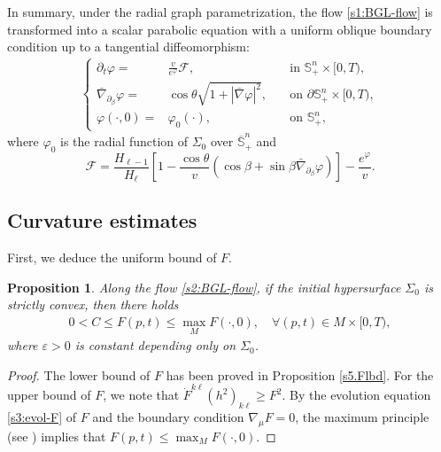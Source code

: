 \documentclass[11pt,reqno]{amsart}
\newtheorem{prop}[thm]{Proposition}
\theoremstyle{definition}
\theoremstyle{remark}
\numberwithin{equation}{section}
\renewcommand{\(}{\left(}
\renewcommand{\)}{\right)}
\renewcommand{\-}{\overline}
\renewcommand{\b}{\beta}
\renewcommand{\t}{\theta}
\begin{document}
In summary, under the radial graph parametrization, the flow \eqref{s1:BGL-flow} is transformed into a scalar parabolic equation with a uniform oblique boundary condition up to a tangential diffeomorphism:
\begin{align}\label{s4:scalar-pde}
\left\{\begin{aligned}
\partial_t\varphi=&\frac{v}{e^\varphi}\mathcal{F}, \quad &\text{in $\mathbb S_+^n \times [0,T)$,}\\
\bar{\nabla}_{\partial_\b}\varphi=&\cos\t \sqrt{1+|\bar{\nabla}\varphi|^2}, \quad &\text{on $\partial \mathbb S_{+}^n\times [0,T)$},\\
\varphi(\cdot,0)=&\varphi_0(\cdot), \quad &\text{on $\mathbb S^n_{+}$},
\end{aligned}\right.
\end{align}
where $\varphi_0$ is the radial function of $\Sigma_0$ over $\-{\mathbb S}_{+}^n$ and
$$
\mathcal{F}=\frac{H_{\ell-1}}{H_{\ell}}\left[ 1-\frac{\cos\t}{v}\(\cos\b+\sin \b\bar{\nabla}_{\partial_\b}\varphi\)\right]-\frac{e^\varphi}{v}.
$$

\subsection{Curvature estimates}
First, we deduce the uniform bound of $F$.
\begin{prop}\label{s4:prop-bound-F}
Along the flow \eqref{s2:BGL-flow}, if the initial hypersurface $\Sigma_0$ is strictly convex, then there holds
\begin{align}\label{s4:bounds-F}
0<C \leq F(p,t) \leq \max_{M} F(\cdot,0), \quad \forall (p,t)\in M\times [0,T),
\end{align}
where $\varepsilon>0$ is constant depending only on $\Sigma_0$.
\end{prop}
\begin{proof}
	The lower bound of $F$ has been proved in Proposition \ref{s5.Flbd}. For the upper bound of $F$, we note that $\dot{F}^{k\ell}(h^2)_{k\ell}\geq F^2$. By the evolution equation \eqref{s3:evol-F} of $F$ and the boundary condition $\nabla_\mu F=0$, the maximum principle (see \cite[Theorem 3.1]{Stahl1996-2}) implies that $F(p,t) \leq \max_{M} F(\cdot,0)$.
\end{proof}
\end{document}
